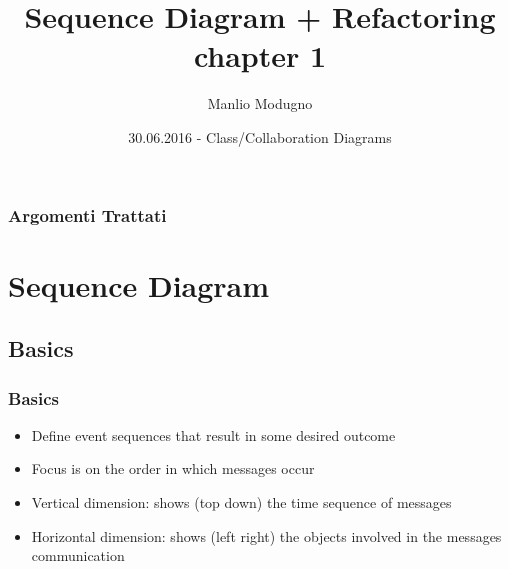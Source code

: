 \documentclass{beamer}
\title{Sequence Diagram + Refactoring chapter 1}
\author{Manlio Modugno}
\institute[GMTechnologies]
\date[30.06.2016] 
{30.06.2016 - Class/Collaboration Diagrams}
\begin{document}
\begin{frame}
  \titlepage
\end{frame}

\begin{frame}
  \frametitle{Argomenti Trattati}
  \tableofcontents
\end{frame}

\section{Sequence Diagram}
\subsection{Basics}
\begin{frame}
  \frametitle{Basics}
  \begin{itemize}
  		\item<+-> Define event sequences that result in some desired outcome
		\item<+-> Focus is on the order in which messages occur
		\item<+-> Vertical dimension: shows (top down) the time sequence of messages
		\item<+-> Horizontal dimension: shows (left right) the objects involved in the messages communication
  \end{itemize}
\end{frame}
\end{document}
